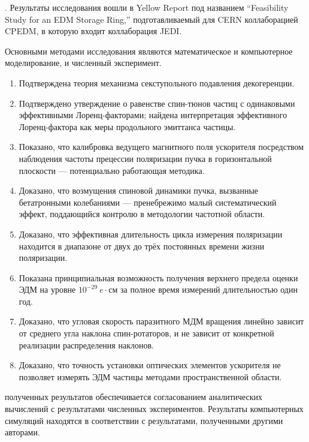 {\influence}. Результаты исследования вошли в Yellow Report под названием ``Feasibility Study for an EDM Storage Ring,'' подготавливаемый для CERN коллаборацией CPEDM, в которую входит коллаборация JEDI.

{\methods} Основными методами исследования являются математическое и компьютерное моделирование, и численный эксперимент.

{}
\begin{enumerate}
	\item Подтверждена теория механизма секступольного подавления декогеренции. %
  	\item Подтверждено утверждение о равенстве спин-тюнов частиц с одинаковыми эффективными Лоренц-факторами; найдена интерпретация эффективного Лоренц-фактора как меры продольного эмиттанса частицы. %
  	\item Показано, что калибровка ведущего магнитного поля ускорителя посредством наблюдения частоты прецессии поляризации пучка в горизонтальной плоскости --- потенциально работающая методика.
  	\item Доказано, что возмущения спиновой динамики пучка, вызванные бетатронными колебаниями --- пренебрежимо малый систематический эффект, поддающийся контролю в методологии частотной области. %
  	\item Доказано, что эффективная длительность цикла измерения поляризации находится в диапазоне от двух до трёх постоянных времени жизни поляризации. %
  	\item Показана принципиальная возможность получения верхнего предела оценки ЭДМ на уровне $10^{-29}~e\cdot$см за полное время измерений длительностью один год. %
  	\item Доказано, что угловая скорость паразитного МДМ вращения линейно зависит от среднего угла наклона спин-ротаторов, и не зависит от конкретной реализации распределения наклонов. %
  	\item Доказано, что точность установки оптических элементов ускорителя не позволяет измерять ЭДМ частицы методами пространственной области. %
\end{enumerate}

{\reliability} полученных результатов обеспечивается согласованием аналитических вычислений с результатами численных экспериментов. Результаты компьютерных симуляций находятся в соответствии с результатами, полученными другими авторами.



